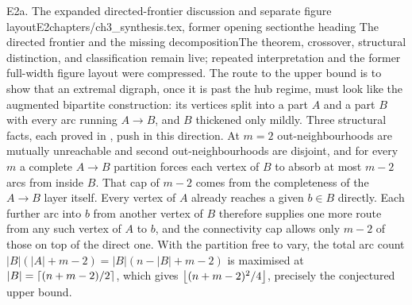 \begin{offcut}{E2a. The expanded directed-frontier discussion and separate figure layout}{E2}{chapters/ch3\_synthesis.tex, former opening section}{the heading The directed frontier and the missing decomposition}{The theorem, crossover, structural distinction, and classification remain live; repeated interpretation and the former full-width figure layout were compressed.}
The route to the upper bound is to show that an extremal digraph, once it is past the hub regime, must look like the augmented bipartite construction: its vertices split into a part $A$ and a part $B$ with every arc running $A \to B$, and $B$ thickened only mildly. Three structural facts, each proved in , push in this direction. At $m = 2$ out-neighbourhoods are mutually unreachable and second out-neighbourhoods are disjoint, and for every $m$ a complete $A \to B$ partition forces each vertex of $B$ to absorb at most $m - 2$ arcs from inside $B$. That cap of $m - 2$ comes from the completeness of the $A \to B$ layer itself. Every vertex of $A$ already reaches a given $b \in B$ directly. Each further arc into $b$ from another vertex of $B$ therefore supplies one more route from any such vertex of $A$ to $b$, and the connectivity cap allows only $m - 2$ of those on top of the direct one. With the partition free to vary, the total arc count $|B|(|A| + m - 2) = |B|(n - |B| + m - 2)$ is maximised at $|B| = \left\lceil (n+m-2)/2 \right\rceil$, which gives $\left\lfloor (n+m-2)^2/4 \right\rfloor$, precisely the conjectured upper bound.


\end{offcut}
